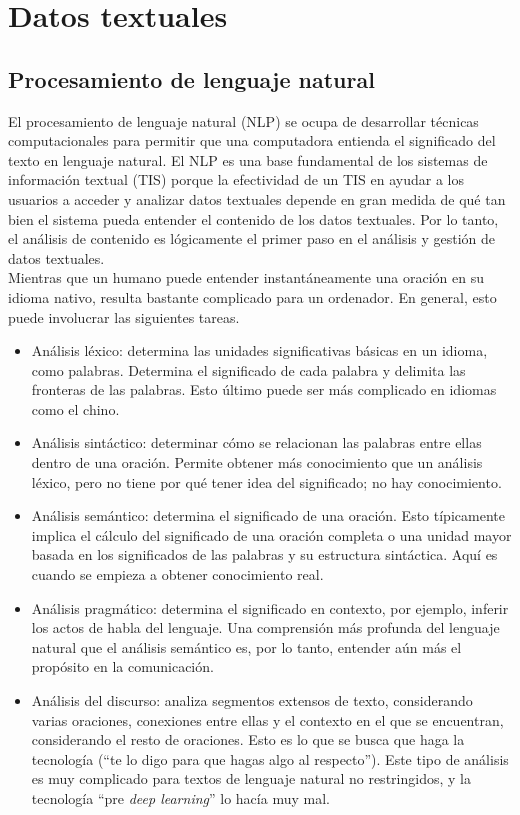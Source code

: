 \chapter{Datos textuales}\label{Chapter2} 

\section{Procesamiento de lenguaje natural}

El procesamiento de lenguaje natural (NLP) se ocupa de desarrollar técnicas computacionales para permitir que una computadora entienda el significado del texto en lenguaje natural. El NLP es una base fundamental de los sistemas de información textual (TIS) porque la efectividad de un TIS en ayudar a los usuarios a acceder y analizar datos textuales depende en gran medida de qué tan bien el sistema pueda entender el contenido de los datos textuales. Por lo tanto, el análisis de contenido es lógicamente el primer paso en el análisis y gestión de datos textuales. \\

Mientras que un humano puede entender instantáneamente una oración en su idioma nativo, resulta bastante complicado para un ordenador. En general, esto puede involucrar las siguientes tareas.
\begin{itemize}
\item Análisis léxico: determina las unidades significativas básicas en un idioma, como palabras. Determina el significado de cada palabra y delimita las fronteras de las palabras. Esto último puede ser más complicado en idiomas como el chino.
\item Análisis sintáctico: determinar cómo se relacionan las palabras entre ellas dentro de una oración. Permite obtener más conocimiento que un análisis léxico, pero no tiene por qué tener idea del significado; no hay conocimiento.
\item Análisis semántico: determina el significado de una oración. Esto típicamente implica el cálculo del significado de una oración completa o una unidad mayor basada en los significados de las palabras y su estructura sintáctica. Aquí es cuando se empieza a obtener conocimiento real. 
\item Análisis pragmático: determina el significado en contexto, por ejemplo, inferir los actos de habla del lenguaje. Una comprensión más profunda del lenguaje natural que el análisis semántico es, por lo tanto, entender aún más el propósito en la comunicación.
\item Análisis del discurso: analiza segmentos extensos de texto, considerando varias oraciones, conexiones entre ellas y el contexto en el que se encuentran, considerando el resto de oraciones. Esto es lo que se busca que haga la tecnología (``te lo digo para que hagas algo al respecto''). Este tipo de análisis es muy complicado para textos de lenguaje natural no restringidos, y la tecnología ``pre \textit{deep learning}'' lo hacía muy mal. 
\end{itemize}

